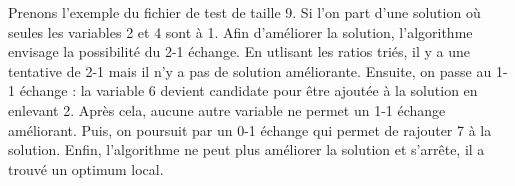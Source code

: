 \begin{example}
  \label{example:echange}
Prenons l'exemple du fichier de test de taille 9. Si l'on part d'une solution où seules les variables 2 et 4 sont à 1. Afin d'améliorer la solution, l'algorithme envisage la possibilité du 2-1 échange. En utlisant les ratios triés, il y a une tentative de 2-1 mais il n'y a pas de solution améliorante. Ensuite, on passe au 1-1 échange : la variable 6 devient candidate pour être ajoutée à la solution en enlevant 2. Après cela, aucune autre variable ne permet un 1-1 échange améliorant. Puis, on poursuit par un 0-1 échange qui permet de rajouter 7 à la solution. Enfin, l'algorithme ne peut plus améliorer la solution et s'arrête, il a trouvé un optimum local. %
\end{example}

%
%

\vspace{5mm}
\noindent
{}
\vspace{2mm}

